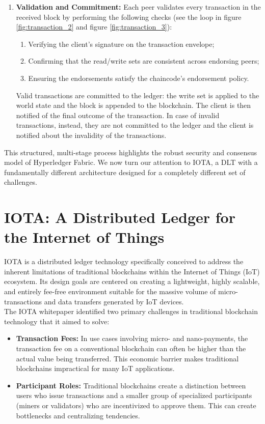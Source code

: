 \documentclass{scrbook}
\begin{document}
\begin{enumerate}
    \item \textbf{Validation and Commitment:} Each peer validates every transaction in the received block by performing the following checks (see the loop in figure \ref{fig:transaction_2} and figure \ref{fig:transaction_3}):
        \begin{enumerate}[label=\Roman*.]
            \item Verifying the client's signature on the transaction envelope;
            \item Confirming that the read/write sets are consistent across endorsing peers;
            \item Ensuring the endorsements satisfy the chaincode's endorsement policy.
        \end{enumerate}
    Valid transactions are committed to the ledger: the write set is applied to the world state and the block is appended to the blockchain. The client is then notified of the final outcome of the transaction. In case of invalid transactions, instead, they are not committed to the ledger and the client is notified about the invalidity of the transactions.
\end{enumerate}

This structured, multi-stage process highlights the robust security and consensus model of Hyperledger Fabric. We now turn our attention to IOTA, a DLT with a fundamentally different architecture designed for a completely different set of challenges.

\chapter{IOTA: A Distributed Ledger for the Internet of Things}

IOTA is a distributed ledger technology specifically conceived to address the inherent limitations of traditional blockchains within the Internet of Things (IoT) ecosystem. Its design goals are centered on creating a lightweight, highly scalable, and entirely fee-free environment suitable for the massive volume of micro-transactions and data transfers generated by IoT devices.\\

The IOTA whitepaper identified two primary challenges in traditional blockchain technology that it aimed to solve:

\begin{itemize}
    \item \textbf{Transaction Fees:} In use cases involving micro- and nano-payments, the transaction fee on a conventional blockchain can often be higher than the actual value being transferred. This economic barrier makes traditional blockchains impractical for many IoT applications.
    
    \item \textbf{Participant Roles:} Traditional blockchains create a distinction between users who issue transactions and a smaller group of specialized participants (miners or validators) who are incentivized to approve them. This can create bottlenecks and centralizing tendencies.
\end{itemize}
\end{document}
